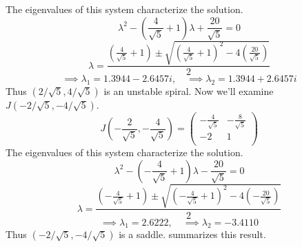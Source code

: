 \documentclass[12pt]{article}
\begin{document}
The eigenvalues of this system characterize the solution.
\begin{equation*}
  \lambda^2 - \left(\frac{4}{\sqrt{5}}+1\right)\lambda + \frac{20}{\sqrt{5}} = 0
\end{equation*}
\begin{equation*}
  \lambda = \frac{\left(\frac{4}{\sqrt{5}}+1\right) \pm
    \sqrt{{\left(\frac{4}{\sqrt{5}}+1\right)}^2-4\left(\frac{20}{\sqrt{5}}\right)}}{2}
\end{equation*}
\begin{equation*}
  \implies \lambda_1 = 1.3944 - 2.6457i, \quad \implies \lambda_2 = 1.3944 + 2.6457i
\end{equation*}
Thus $(2/\sqrt{5},4/\sqrt{5})$ is an unstable spiral. Now we'll examine
$J(-2/\sqrt{5},-4/\sqrt{5})$.
\begin{equation*}
  J\left(-\frac{2}{\sqrt{5}},-\frac{4}{\sqrt{5}}\right) =
  \begin{pmatrix}
    -\frac{4}{\sqrt{5}} & -\frac{8}{\sqrt{5}} \\ -2 & 1 \\
  \end{pmatrix}
\end{equation*}
The eigenvalues of this system characterize the solution.
\begin{equation*}
  \lambda^2 - \left(-\frac{4}{\sqrt{5}}+1\right)\lambda - \frac{20}{\sqrt{5}} = 0
\end{equation*}
\begin{equation*}
  \lambda = \frac{\left(-\frac{4}{\sqrt{5}}+1\right) \pm
    \sqrt{{\left(-\frac{4}{\sqrt{5}}+1\right)}^2-4\left(-\frac{20}{\sqrt{5}}\right)}}{2}
\end{equation*}
\begin{equation*}
  \implies \lambda_1 = 2.6222, \quad \implies \lambda_2 = -3.4110
\end{equation*}
Thus $(-2/\sqrt{5},-4/\sqrt{5})$ is a saddle. 
summarizes this result.
\end{document}
